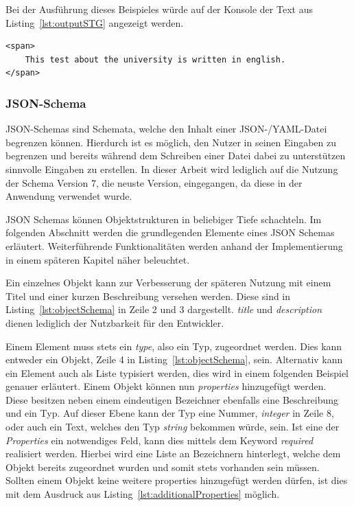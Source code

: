 

Bei der Ausführung dieses Beispieles würde auf der Konsole der Text aus Listing~\ref{lst:outputSTG} angezeigt werden.

\begin{lstlisting}[label={lst:outputSTG}]
<span>
    This test about the university is written in english.
</span>
\end{lstlisting}

\subsubsection{JSON-Schema}\label{subsubsec:json-schema}
JSON-Schemas sind Schemata, welche den Inhalt einer JSON-/YAML-Datei begrenzen können.
Hierdurch ist es möglich, den Nutzer in seinen Eingaben zu begrenzen und bereits während dem Schreiben einer Datei dabei zu unterstützen sinnvolle Eingaben zu erstellen.
In dieser Arbeit wird lediglich auf die Nutzung der Schema Version 7, die neuste Version, eingegangen, da diese in der Anwendung verwendet wurde.

JSON Schemas können Objektstrukturen in beliebiger Tiefe schachteln.
Im folgenden Abschnitt werden die grundlegenden Elemente eines JSON Schemas erläutert.
Weiterführende Funktionalitäten werden anhand der Implementierung in einem späteren Kapitel näher beleuchtet.

Ein einzelnes Objekt kann zur Verbesserung der späteren Nutzung mit einem Titel und einer kurzen Beschreibung versehen werden.
Diese sind in Listing~\ref{lst:objectSchema} in Zeile 2 und 3 dargestellt.
\textit{title} und \textit{description} dienen lediglich der Nutzbarkeit für den Entwickler.



Einem Element muss stets ein \textit{type}, also ein Typ, zugeordnet werden.
Dies kann entweder ein Objekt, Zeile 4 in Listing~\ref{lst:objectSchema}, sein.
Alternativ kann ein Element auch als Liste typisiert werden, dies wird in einem folgenden Beispiel genauer erläutert.
Einem Objekt können nun \textit{properties} hinzugefügt werden.
Diese besitzen neben einem eindeutigen Bezeichner ebenfalls eine Beschreibung und ein Typ.
Auf dieser Ebene kann der Typ eine Nummer, \textit{integer} in Zeile 8, oder auch ein Text, welches den Typ \textit{string} bekommen würde, sein.
Ist eine der \textit{Properties} ein notwendiges Feld, kann dies mittels dem Keyword \textit{required} realisiert werden.
Hierbei wird eine Liste an Bezeichnern hinterlegt, welche dem Objekt bereits zugeordnet wurden und somit stets vorhanden sein müssen.
Sollten einem Objekt keine weitere properties hinzugefügt werden dürfen, ist dies mit dem Ausdruck aus Listing~\ref{lst:additionalProperties} möglich.

